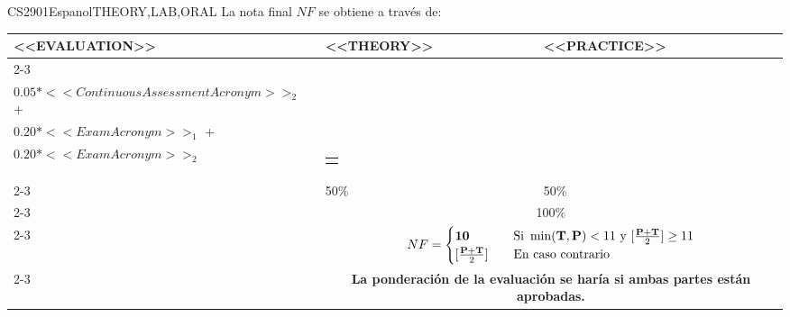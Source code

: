   \begin{evaluation}{CS2901}{Espanol}{THEORY,LAB,ORAL}
  La nota final $NF$ se obtiene a través de:
 
  \begin{tabularx}{0.9\textwidth}{|X|p{}|p{}|} \hline
  \multirow{4}{*}{\uppercase{<<Evaluation>>}} & \uppercase{<<Theory>>} & \uppercase{<<Practice>>} \\ \cline{2-3}
  & %
      \begin{minipage}{0.95\textwidth}
      \begin{tabular}{l}
          $\text{\textbf{T}} = 0.05*<<ContinuousAssessmentAcronym>>_{1}$  + \\
          $0.05*<<ContinuousAssessmentAcronym>>_{2}$  + \\
          $0.20*<<ExamAcronym>>_{1}$  + \\  
          $0.20*<<ExamAcronym>>_{2}$  
          \end{tabular}
      \end{minipage}
  & %
      \begin{minipage}{0.95\textwidth}
      \begin{tabular}{l}
          $\text{\textbf{P}} =0.2(A + D) + 0.3(Dev) + 0.3(DF)$ 
      \end{tabular}
      \end{minipage}                 \\ \cline{2-3}

  & %
  50\% 
  & %
  50\% \\ \cline{2-3}
  & \multicolumn{2}{c|}{100\%}  \\ \cline{2-3}
  & \multicolumn{2}{c|}{
    \begin{math}
      NF =
      \begin{cases}
        \text{\textbf{10}}   & \quad \text{Si } \min(\text{\textbf{T}},\text{\textbf{P}}) < 11 \text{ y }  [\frac{\textbf{P} + \text{\textbf{T}}}{2}] \geq  11\\
        [\frac{\textbf{P} + \text{\textbf{T}}}{2}]    & \quad \text{En caso contrario}
      \end{cases}
    \end{math}
  } \\ \cline{2-3}
  & \multicolumn{2}{c|}{\textbf{La ponderación de la evaluación se haría si ambas partes están aprobadas.}}  \\ \hline
  \end{tabularx}
  

\end{evaluation}
